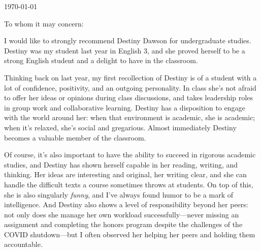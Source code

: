 \documentclass[11pt, letterpaper]{letter} %
\begin{document}

\begin{letter}{
	\today\\	
}


\opening{To whom it may concern:}

I would like to strongly recommend Destiny Dawson for undergraduate studies. 
Destiny was my student last year in English 3, and she proved herself to be a strong English student and a delight to have in the classroom.

Thinking back on last year, my first recollection of Destiny is of a student with a lot of confidence, positivity, and an outgoing personality.
In class she's not afraid to offer her ideas or opinions during class discussions, and takes leadership roles in group work and collaborative learning.
Destiny has a disposition to engage with the world around her: when that environment is academic, she is academic; when it's relaxed, she's social and gregarious.
Almost immediately Destiny becomes a valuable member of the classroom.

Of course, it's also important to have the ability to succeed in rigorous academic studies, and Destiny has shown herself capable in her reading, writing, and thinking.
Her ideas are interesting and original, her writing clear, and she can handle the difficult texts a course sometimes throws at students.
On top of this, she is also singularly \emph{funny}, and I've always found humor to be a mark of intelligence. 
And Destiny also shows a level of responsibility beyond her peers: not only does she manage her own workload successfully---never missing an assignment and completing the honors program despite the challenges of the COVID shutdown---but I often observed her helping her peers and holding them accountable.


\end{letter}
\end{document}
